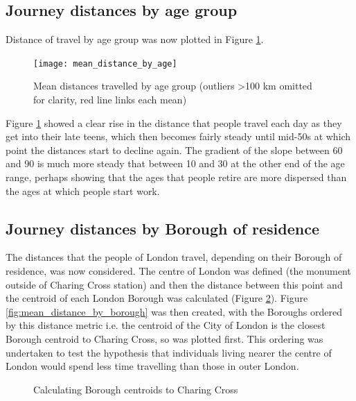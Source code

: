 \subsection{Journey distances by age group}
\label{sec:journey_distances_by_age_group}

Distance of travel by age group was now plotted in Figure \ref{fig:mean_distance_by_age}.

\begin{landscape}

\begin{figure}[H]
\centering
\texttt{[image: mean\_distance\_by\_age]}
\caption{Mean distances travelled by age group (outliers \textgreater 100 km omitted for clarity, red line links each mean)}
\label{fig:mean_distance_by_age}
\end{figure}

\end{landscape}

Figure \ref{fig:mean_distance_by_age} showed a clear rise in the distance that people travel each day as they get into their late teens, which then becomes fairly steady until mid-50s at which point the distances start to decline again. The gradient of the slope between 60 and 90 is much more steady that between 10 and 30 at the other end of the age range, perhaps showing that the ages that people retire are more dispersed than the ages at which people start work.

\subsection{Journey distances by Borough of residence}
\label{sec:journey_distances_by_borough_of_residence}

The distances that the people of London travel, depending on their Borough of residence, was now considered. The centre of London was defined (the monument outside of Charing Cross station) and then the distance between this point and the centroid of each London Borough was calculated (Figure \ref{fig:borough_centroids}). Figure \ref{fig:mean_distance_by_borough} was then created, with the Boroughs ordered by this distance metric i.e. the centroid of the City of London is the closest Borough centroid to Charing Cross, so was plotted first. This ordering was undertaken to test the hypothesis that individuals living nearer the centre of London would spend less time travelling than those in outer London.

\begin{figure}[H]
\centering
{}
\caption{Calculating Borough centroids to Charing Cross}
\label{fig:borough_centroids}
\end{figure}

